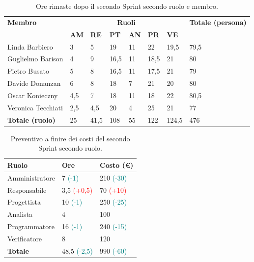 \begin{table}[ht!]
	\centering
	\begin{tabular}{p{4cm} p{1cm} p{1cm} p{1cm} p{1cm} p{1cm} p{1cm} p{3cm}}
		\toprule
        \textbf{Membro} & \multicolumn{6}{c}{\textbf{Ruoli}} & \textbf{Totale (persona)}\\
		& \textbf{AM} & \textbf{RE} & \textbf{PT} & \textbf{AN} & \textbf{PR} & \textbf{VE}\\
		\midrule
        Linda Barbiero          & 3     & 5     & 19     & 11   & 22     & 19,5   & 79,5 \\
        Guglielmo Barison       & 4     & 9     & 16,5     & 11   & 18,5   & 21     & 80\\
        Pietro Busato           & 5     & 8     & 16,5     & 11   & 17,5   & 21     & 79\\
        Davide Donanzan         & 6     & 8     & 18     & 7    & 21     & 20     & 80\\
        Oscar Konieczny         & 4,5   & 7     & 18     & 11   & 18     & 22     & 80,5\\
        Veronica Tecchiati      & 2,5   & 4,5     & 20     & 4    & 25     & 21     & 77\\
        \bottomrule
        \textbf{Totale (ruolo)} & 25    & 41,5    & 108    & 55   & 122     & 124,5 & 476 \\
	\end{tabular}
	\caption{Ore rimaste dopo il secondo Sprint secondo ruolo e membro.}
	\label{table:Ore rimaste dopo il secondo Sprint secondo ruolo e membro}
\end{table}
\begin{table}[ht!]
	\centering
	\begin{tabular}{p{4cm} p{2cm} p{2cm}}
        \toprule
        \textbf{Ruolo} & \textbf{Ore} & \textbf{Costo (€)} \\
        \midrule
        Amministratore & 7 \textcolor{teal}{(-1)} & 210 \textcolor{teal}{(-30)}\\
        Responsabile & 3,5 \textcolor{red}{(+0,5)} & 70 \textcolor{red}{(+10)} \\
        Progettista & 10 \textcolor{teal}{(-1)} & 250 \textcolor{teal}{(-25)} \\
        Analista & 4 & 100 \\
        Programmatore & 16 \textcolor{teal}{(-1)} & 240 \textcolor{teal}{(-15)} \\
        Verificatore & 8 & 120 \\
        \bottomrule
        \textbf{Totale} & 48,5 \textcolor{teal}{(-2,5)} & 990 \textcolor{teal}{(-60)}
    \end{tabular}
    \caption{Preventivo a finire dei costi del secondo Sprint secondo ruolo.}
	\label{table:Preventivo a finire dei costi del secondo Sprint secondo ruolo}
\end{table}

